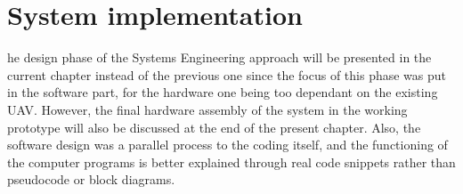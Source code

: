 
\let\textcircled=\pgftextcircled
\chapter{System implementation}

he design phase of the Systems Engineering approach will be presented in the current chapter instead of the previous one since the focus of this phase was put in the software part, for the hardware one being too dependant on the existing UAV.
However, the final hardware assembly of the system in the working prototype will also be discussed at the end of the present chapter.
Also, the software design was a parallel process to the coding itself, and the functioning of the computer programs is better explained through real code snippets rather than pseudocode or block diagrams.


